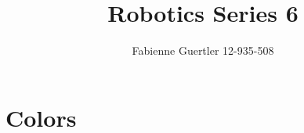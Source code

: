 \documentclass[a4paper]{article}
\title{Robotics Series 6}
\author{Fabienne Guertler 12-935-508}
\begin{document}
	
	\section{Colors}
	\subsection{}
	
\end{document}
